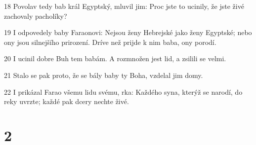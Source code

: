 \par 18 Povolav tedy bab král Egyptský, mluvil jim: Proc jste to ucinily, že jste živé zachovaly pacholíky?
\par 19 I odpovedely baby Faraonovi: Nejsou ženy Hebrejské jako ženy Egyptské; nebo ony jsou silnejšího prirození. Dríve než prijde k nim baba, ony porodí.
\par 20 I ucinil dobre Buh tem babám. A rozmnožen jest lid, a zsilili se velmi.
\par 21 Stalo se pak proto, že se bály baby ty Boha, vzdelal jim domy.
\par 22 I prikázal Farao všemu lidu svému, rka: Každého syna, kterýž se narodí, do reky uvrzte; každé pak dcery nechte živé.

\chapter{2}

